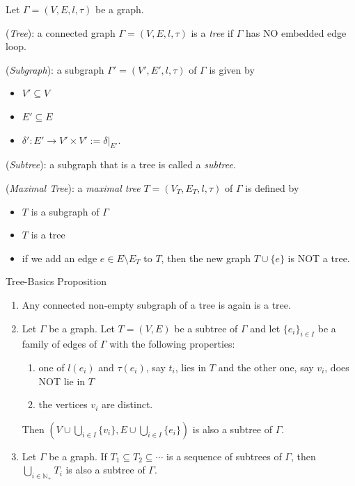 \begin{definition}
    Let $\Gamma = (V,E,l,\tau)$ be a graph.
    \item (\textit{Tree}): a connected graph $\Gamma = (V,E,l,\tau)$ is a \textit{tree} if $\Gamma$ has NO embedded edge loop.
    \item (\textit{Subgraph}): a subgraph $\Gamma' = (V',E',l,\tau)$ of $\Gamma$ is given by
    \begin{itemize}
        \item $V' \subseteq V$
        \item $E' \subseteq E$
        \item $\delta': E' \rightarrow V' \times V' := \left. \delta \right|_{E'}$.
    \end{itemize}
    \item (\textit{Subtree}): a subgraph that is a tree is called a \textit{subtree}.
    \item (\textit{Maximal Tree}): a \textit{maximal tree} $T = (V_T , E_T,l,\tau)$ of $\Gamma$ is defined by
    \begin{itemize}
        \item $T$ is a subgraph of $\Gamma$
        \item $T$ is a tree
        \item if we add an edge $e \in E \setminus E_T$ to $T$, then the new graph $T \cup \{e\}$ is NOT a tree.
    \end{itemize}
\end{definition}

\begin{proposition}{Tree-Basics Proposition}\\
\begin{enumerate}
    \item Any connected non-empty subgraph of a tree is again is a tree.
    \item Let $\Gamma$ be a graph. Let $T=(V,E)$ be a subtree of $\Gamma$ and let $\{e_i\}_{i\in I}$ be a family of edges of $\Gamma$ with the following properties:
    \begin{enumerate}
        \item one of $l(e_i)$ and $\tau(e_i)$, say $t_i$, lies in $T$ and the other one, say $v_i$, does NOT lie in $T$
        \item the vertices $v_i$ are distinct.
    \end{enumerate}
    Then $(V \cup \bigcup_{i\in I}\{v_i\}, E \cup \bigcup_{i \in I} \{e_i\})$ is also a subtree of $\Gamma$.

    \item Let $\Gamma$ be a graph. If $T_1 \subseteq T_2 \subseteq \cdots$ is a sequence of subtrees of $\Gamma$, then $\bigcup_{i \in \mathbb{N}_+} T_i$ is also a subtree of $\Gamma$.
\end{enumerate}
\end{proposition}

